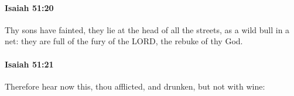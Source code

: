 		\paragraph{Isaiah 51:20} %
			\label{ISAIAH-51-20}

			Thy sons have fainted, they lie at the head of all the streets, as a wild bull in a net: they are full of the fury of the LORD, the rebuke of thy God.


		\paragraph{Isaiah 51:21} %
			\label{ISAIAH-51-21}

			Therefore hear now this, thou afflicted, and drunken, but not with wine:



